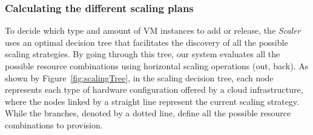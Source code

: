 




\subsubsection{Calculating the different scaling plans}

To decide which type and amount of VM instances to add or release, the \emph{Scaler} uses an optimal decision tree that facilitates the discovery of all the possible scaling strategies. By going through this tree, our system evaluates all the possible resource combinations using horizontal scaling operations (out, back). As shown by Figure~\ref{fig:scalingTree}, in the scaling decision tree, each node represents each type of hardware configuration offered by a cloud infrastructure, where the nodes linked by a straight line represent the current scaling strategy. While the branches, denoted by a dotted line, define all the possible resource combinations to provision. 

